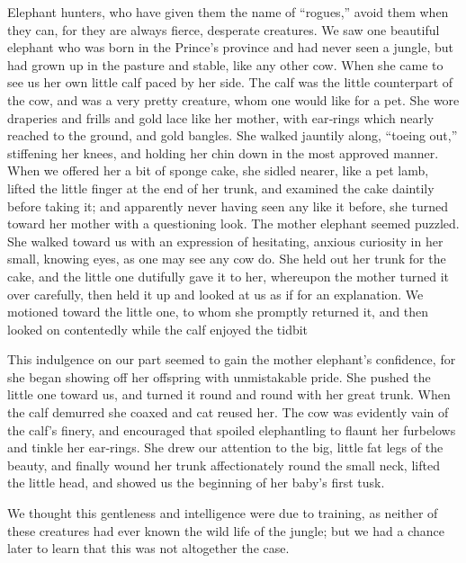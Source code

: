 \documentclass[12pt]{book}
\begin{document}
Elephant hunters, who have given them the name of “rogues,” avoid them
when they can, for they are always fierce, desperate creatures. We saw one
beautiful elephant who was born in the Prince’s province and had never seen a
jungle, but had grown up in the pasture and stable, like any other cow. When
she came to see us her own little calf paced by her side. The calf was the little
counterpart of the cow, and was a very pretty creature, whom one would like for
a pet. She wore draperies and frills and gold lace like her mother, with ear‐rings
which nearly reached to the ground, and gold bangles. She walked jauntily along,
“toeing out,” stiffening her knees, and holding her chin down in the most approved
manner. When we offered her a bit of sponge cake, she sidled nearer, like a pet
lamb, lifted the little finger at the end of her trunk, and examined the cake daintily
before taking it; and apparently never having seen any like it before, she turned
toward her mother with a questioning look. The mother elephant seemed puzzled.
She walked toward us with an expression of hesitating, anxious curiosity in her
small, knowing eyes, as one may see any cow do. She held out her trunk for the
cake, and the little one dutifully gave it to her, whereupon the mother turned
it over carefully, then held it up and looked at us as if for an explanation. We
motioned toward the little one, to whom she promptly returned it, and then
looked on contentedly while the calf enjoyed the tidbit

This indulgence on our part seemed to gain the mother elephant’s confidence,
for she began showing off her offspring with unmistakable pride. She pushed the
little one toward us, and turned it round and round with her great trunk. When
the calf demurred she coaxed and cat reused her. The cow was evidently vain of
the calf’s finery, and encouraged that spoiled elephantling to flaunt her furbelows
and tinkle her ear‐rings. She drew our attention to the big, little fat legs of the
beauty, and finally wound her trunk affectionately round the small neck, lifted
the little head, and showed us the beginning of her baby’s first tusk.

We thought this gentleness and intelligence were due to training, as neither
of these creatures had ever known the wild life of the jungle; but we had a chance
later to learn that this was not altogether the case.
\end{document}
